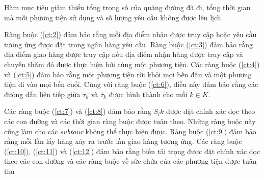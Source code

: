 Hàm mục tiêu giảm thiểu tổng trọng số của quãng đường đã đi, tổng thời gian mà mỗi phương tiện sử dụng và số lượng yêu cầu không được lên lịch.

Ràng buộc (\ref{ct:2}) đảm bảo rằng mỗi địa điểm nhận được truy cập hoặc yêu cầu tương ứng được đặt trong ngân hàng yêu cầu. Ràng buộc (\ref{ct:3}) đảm bảo rằng địa điểm giao hàng được truy cập nếu địa điểm nhận hàng được truy cập và chuyến thăm đó được thực hiện bởi cùng một phương tiện. Các ràng buộc (\ref{ct:4}) và (\ref{ct:5}) đảm bảo rằng một phương tiện rời khỏi mọi bến đầu và một phương tiện đi vào mọi bến cuối. Cùng với ràng buộc (\ref{ct:6}), điều này đảm bảo rằng các đường dẫn liên tiếp giữa $\tau_k$ và $\acute{\tau_k}$ được hình thành cho mỗi $k \in K$.

Các ràng buộc (\ref{ct:7}) và (\ref{ct:8}) đảm bảo rằng $S_ik$ được đặt chính xác dọc theo các con đường và các thời gian ràng buộc được tuân theo. Những ràng buộc này cũng làm cho các \textit{subtour} không thể thực hiện được.
Ràng buộc (\ref{ct:9}) đảm bảo rằng mỗi lần lấy hàng xảy ra trước lần giao hàng tương ứng. Các ràng buộc (\ref{ct:10}), (\ref{ct:11}) và (\ref{ct:12}) đảm bảo rằng biến tải trọng được đặt chính xác dọc theo các con đường và các ràng buộc về sức chứa của các phương tiện được tuân thủ
